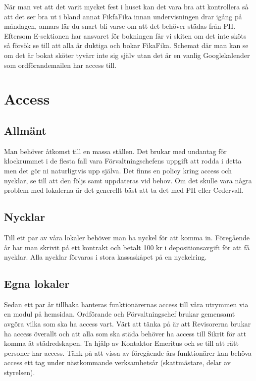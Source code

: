 \documentclass[10pt]{article}
\begin{document}
    När man vet att det varit mycket fest i huset kan det vara bra att kontrollera så att det ser bra ut i bland annat FikfaFika innan undervisningen drar igång på måndagen, annars lär du snart bli varse om att det behöver städas från PH. Eftersom E-sektionen har ansvaret för bokningen får vi skiten om det inte sköts så försök se till att alla är duktiga och bokar FikaFika. Schemat där man kan se om det är bokat sköter tyvärr inte sig själv utan det är en vanlig Googlekalender som ordförandemailen har access till.
    
    \section{Access}
    
    \subsection{Allmänt}
    
    Man behöver åtkomst till en massa ställen. Det brukar med undantag för klockrummet i de flesta fall vara Förvaltningschefens uppgift att rodda i detta men det gör ni naturligtvis upp själva. Det finns en policy kring access och nycklar, se till att den följs samt uppdateras vid behov. Om det skulle vara några problem med lokalerna är det generellt bäst att ta det med PH eller Cedervall.
    
    \subsection{Nycklar}
    
    Till ett par av våra lokaler behöver man ha nyckel för att komma in. Föregående år har man skrivit på ett kontrakt och betalt 100 kr i depositionsavgift för att få nycklar. Alla nycklar förvaras i stora kassaskåpet på en nyckelring.
     
    \subsection{Egna lokaler}
    
    Sedan ett par år tillbaka hanteras funktionärernas access till våra utrymmen via en modul på hemsidan. Ordförande och Förvaltningschef brukar gemensamt avgöra vilka som ska ha access vart. Värt att tänka på är att Revisorerna brukar ha access överallt och att alla som ska städa behöver ha access till Sikrit för att komma åt städredskapen. Ta hjälp av Kontaktor Emeritus och se till att rätt personer har access. Tänk på att vissa av föregående års funktionärer kan behöva access ett tag under nästkommande verksamhetsår (skattmästare, delar av styrelsen).
     
\end{document}
